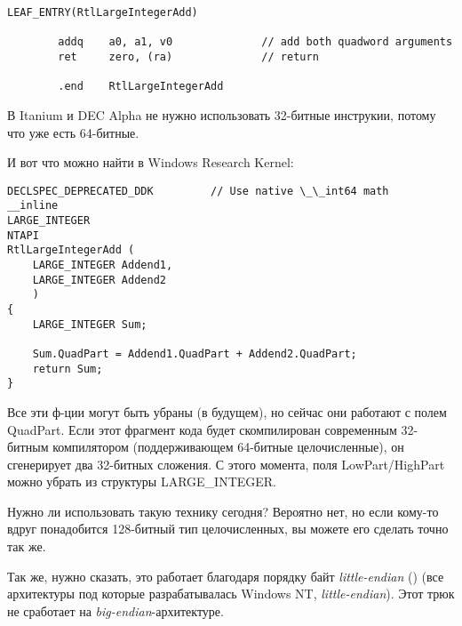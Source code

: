 \begin{lstlisting}[caption=Архитектура DEC Alpha]
        LEAF_ENTRY(RtlLargeIntegerAdd)

        addq    a0, a1, v0              // add both quadword arguments
        ret     zero, (ra)              // return

        .end    RtlLargeIntegerAdd
\end{lstlisting}

В Itanium и DEC Alpha не нужно использовать 32-битные инструкии, потому что уже есть 64-битные.

И вот что можно найти в Windows Research Kernel:

\begin{lstlisting}[style=customc]
DECLSPEC_DEPRECATED_DDK         // Use native \_\_int64 math
__inline
LARGE_INTEGER
NTAPI
RtlLargeIntegerAdd (
    LARGE_INTEGER Addend1,
    LARGE_INTEGER Addend2
    )
{
    LARGE_INTEGER Sum;

    Sum.QuadPart = Addend1.QuadPart + Addend2.QuadPart;
    return Sum;
}
\end{lstlisting}

Все эти ф-ции могут быть убраны (в будущем), но сейчас они работают с полем QuadPart.
Если этот фрагмент кода будет скомпилирован современным 32-битным компилятором (поддерживающем 64-битные целочисленные),
он сгенерирует два 32-битных сложения.
С этого момента, поля LowPart/HighPart можно убрать из структуры  LARGE\_INTEGER.

Нужно ли использовать такую технику сегодня?
Вероятно нет, но если кому-то вдруг понадобится 128-битный тип целочисленных, вы можете его сделать точно так же.

Так же, нужно сказать, это работает благодаря порядку байт \emph{little-endian} ()
(все архитектуры под которые разрабатывалась Windows NT, \emph{little-endian}).
Этот трюк не сработает на \emph{big-endian}-архитектуре.

